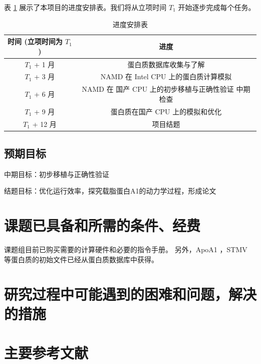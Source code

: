 表 \ref{tab:progress} 展示了本项目的进度安排表。我们将从立项时间 $T_1$ 开始逐步完成每个任务。

\begin{table}[h]
    \centering
    \caption{进度安排表}
    \label{tab:progress}
    \begin{tabular}{cc}
        \toprule
        时间 (立项时间为 $T_1$) & 进度                              \\
        \midrule
        $T_1$ + 1 月      & 蛋白质数据库收集与了解                     \\
        $T_1$ + 3 月      & NAMD 在 Intel CPU 上的蛋白质计算模拟      \\
        $T_1$ + 6 月      & NAMD 在 国产 CPU 上的初步移植与正确性验证 中期检查 \\
        $T_1$ + 9 月      & 蛋白质在国产 CPU 上的模拟和优化              \\
        $T_1$ + 12 月     & 项目结题                            \\
        \bottomrule
    \end{tabular}
\end{table}

\subsection{预期目标}

中期目标：初步移植与正确性验证

结题目标：优化运行效率，探究载脂蛋白A1的动力学过程，形成论文

\section{课题已具备和所需的条件、经费}

课题组目前已购买需要的计算硬件和必要的指令手册。
另外，ApoA1 ，STMV 等蛋白质的初始文件已经从蛋白质数据库中获得。

\section{研究过程中可能遇到的困难和问题，解决的措施}


\section{主要参考文献}



